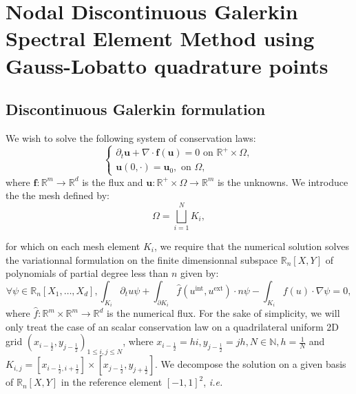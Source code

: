 \documentclass[10pt]{article}
\begin{document}
\pagestyle{fancy}
\fancyfoot{}
\fancyfoot[C]{\thepage}

\fancyhead{}
\fancyhead[LE]{\nouppercase{\rightmark\hfill\leftmark}}
\fancyhead[RO]{\nouppercase{\leftmark\hfill\rightmark}}

\section{Nodal Discontinuous Galerkin Spectral Element Method using Gauss-Lobatto quadrature points}

\subsection{Discontinuous Galerkin formulation}
We wish to solve the following system of conservation laws:
\begin{equation*}
  \begin{cases}
    \partial_t \mathbf{u} + \nabla\cdot \mathbf{f}(\mathbf{u}) = 0 \text{ on }\mathbb{R}^+\times\Omega, \\
    \mathbf{u}(0,\cdot) = \mathbf{u}_0,\text{ on } \Omega,
    \end{cases}
\end{equation*}
where \(\mathbf{f}:\mathbb{R}^m\longrightarrow\mathbb{R}^d\) is the flux and \(\mathbf{u} : \mathbb{R}^+\times\Omega\longrightarrow \mathbb{R}^m\) is the unknowns. We introduce the the mesh defined by:
\begin{equation*}
  \Omega = \bigsqcup_{i=1}^N K_i,
\end{equation*}

for which on each mesh element \(K_i\), we require that the numerical solution solves the variationnal formulation on the finite dimensionnal subspace \(\mathbb{R}_n[X,Y]\) of polynomials of partial degree less than \(n\) given by:
\begin{equation}\label{eq:DG}
  \forall\psi\in\mathbb{R}_n[X_1,\ldots, X_d], \int_{K_i}\partial_t u\psi + \int_{\partial K_i} \widehat{f}(u^\text{int}, u^\text{ext})\cdot n\psi - \int_{K_i} f(u)\cdot\nabla\psi = 0,
  \end{equation}
where \(\widehat{f}: \mathbb{R}^m\times\mathbb{R}^m\longrightarrow \mathbb{R}^d\) is the numerical flux. For the sake of simplicity, we will only treat the case of an scalar conservation law on a quadrilateral uniform 2D grid \(\left(x_{i-\frac12}, y_{j-\frac12}\right)_{1\leq i,j\leq N}\), where \(x_{i-\frac12} = hi, y_{j-\frac12} = jh, N\in\mathbb{N}, h = \frac1N\) and \(K_{i,j} = \left[x_{i-\frac12, i+\frac12}\right]\times \left[x_{j-\frac12}, y_{j+\frac12}\right]\). We decompose the solution on a given basis of \(\mathbb{R}_n[X,Y]\) in the reference element \([-1,1]^2\), \emph{i.e.}
\end{document}
